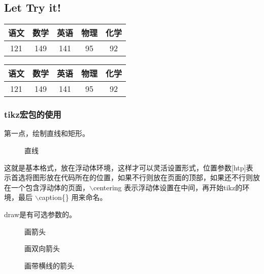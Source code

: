 \documentclass[12pt,a4paper]{article}
\begin{document}
	\subsection{Let Try it!}
	\begin{tabular}{|c|c|c|c|c|}
		\hline
		语文 & 数学 & 英语 & 物理 & 化学 \\
		\hline 
		121 & 149 & 141 & 95 & 92 \\
		\hline
	\end{tabular}
	\begin{table}[H]
		\centering
			\begin{tabular}{|c|c|c|c|c|}
			\hline
			语文 & 数学 & 英语 & 物理 & 化学 \\
			\hline 
			121 & 149 & 141 & 95 & 92 \\
			\hline
			\end{tabular}
	\end{table}
	\vspace{-12pt}
	\lipsum[1-2]
	
	\subsubsection{tikz宏包的使用}
	第一点，绘制直线和矩形。
	
	\begin{figure}[htp]
		\centering
		\caption{直线}
	\end{figure}
	
	这就是基本格式，放在浮动体环境，这样才可以灵活设置形式，位置参数[htp]表示首选将图形放在代码所在的位置，如果不行则放在页面的顶部，如果还不行则放在一个包含浮动体的页面，$\backslash$centering 表示浮动体设置在中间，再开始tikz的环境，最后 $\backslash$caption\{\} 用来命名。
	
	draw是有可选参数的。

	\begin{figure}[htbp]
		\centering
			\caption{画箭头}
			\caption{画双向箭头}
	\end{figure}

	\begin{figure}[htp]
		\centering
		\caption{画带横线的箭头}
	\end{figure}
	
\end{document}
